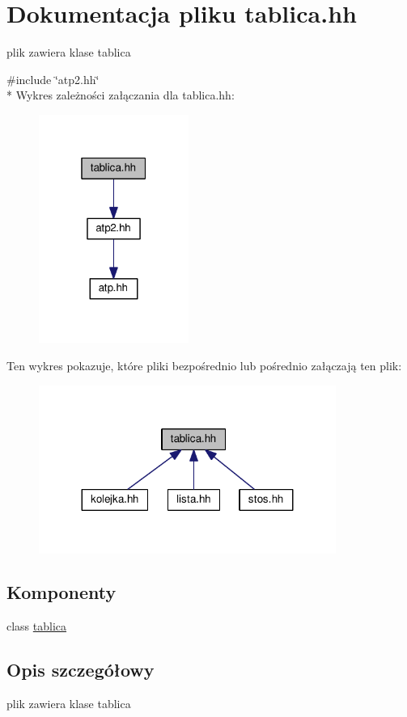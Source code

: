 \hypertarget{tablica_8hh}{}\section{Dokumentacja pliku tablica.\+hh}
\label{tablica_8hh}


plik zawiera klase tablica  


{\ttfamily \#include \char`\"{}atp2.\+hh\char`\"{}}\\*
Wykres zależności załączania dla tablica.\+hh\+:\nopagebreak
\begin{figure}[H]
\begin{center}
\leavevmode
\includegraphics[width=139pt]{tablica_8hh__incl}
\end{center}
\end{figure}
Ten wykres pokazuje, które pliki bezpośrednio lub pośrednio załączają ten plik\+:
\nopagebreak
\begin{figure}[H]
\begin{center}
\leavevmode
\includegraphics[width=275pt]{tablica_8hh__dep__incl}
\end{center}
\end{figure}
\subsection*{Komponenty}
\begin{DoxyCompactItemize}
\item 
class \hyperlink{classtablica}{tablica}
\end{DoxyCompactItemize}


\subsection{Opis szczegółowy}
plik zawiera klase tablica 

